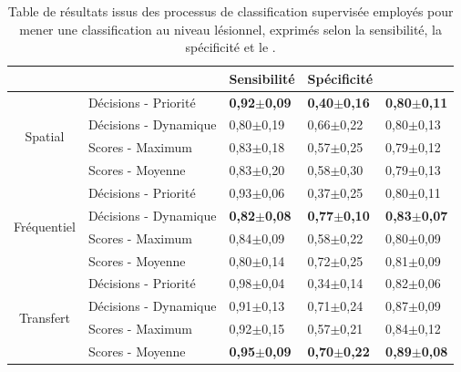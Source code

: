 \begin{table}[H]
    \centering
    \begin{tabular}{cllll}
        \toprule
        \multicolumn{1}{l}{}         &                              & Sensibilité               & Spécificité               & \Fscore{}                 \\ \midrule
        \multirow{4}{*}{Spatial}     & Décisions - Priorité         & \textbf{0,92$\pm$0,09}    & \textbf{0,40$\pm$0,16}    & \textbf{0,80$\pm$0,11}    \\
                                     & Décisions - Dynamique        & 0,80$\pm$0,19             & 0,66$\pm$0,22             & 0,80$\pm$0,13             \\
                                     & Scores - Maximum             & 0,83$\pm$0,18             & 0,57$\pm$0,25             & 0,79$\pm$0,12             \\
                                     & Scores - Moyenne             & 0,83$\pm$0,20             & 0,58$\pm$0,30             & 0,79$\pm$0,13             \\ \midrule
        \multirow{4}{*}{Fréquentiel} & Décisions - Priorité         & 0,93$\pm$0,06             & 0,37$\pm$0,25             & 0,80$\pm$0,11             \\
                                     & Décisions - Dynamique        & \textbf{0,82$\pm$0,08}    & \textbf{0,77$\pm$0,10}    & \textbf{0,83$\pm$0,07}    \\
                                     & Scores - Maximum             & 0,84$\pm$0,09             & 0,58$\pm$0,22             & 0,80$\pm$0,09             \\
                                     & Scores - Moyenne             & 0,80$\pm$0,14             & 0,72$\pm$0,25             & 0,81$\pm$0,09             \\ \midrule
        \multirow{4}{*}{Transfert}   & Décisions - Priorité         & 0,98$\pm$0,04             & 0,34$\pm$0,14             & 0,82$\pm$0,06             \\
                                     & Décisions - Dynamique        & 0,91$\pm$0,13             & 0,71$\pm$0,24             & 0,87$\pm$0,09             \\
                                     & Scores - Maximum             & 0,92$\pm$0,15             & 0,57$\pm$0,21             & 0,84$\pm$0,12             \\
                                     & Scores - Moyenne             & \textbf{0,95$\pm$0,09}    & \textbf{0,70$\pm$0,22}    & \textbf{0,89$\pm$0,08}    \\ \bottomrule
    \end{tabular}
    \caption{Table de résultats issus des processus de classification supervisée employés pour mener une classification au niveau lésionnel, exprimés selon la sensibilité, la spécificité et le \fscore{}.}
    \label{tab:results_lesion_classification_supervised_patient}
\end{table}

